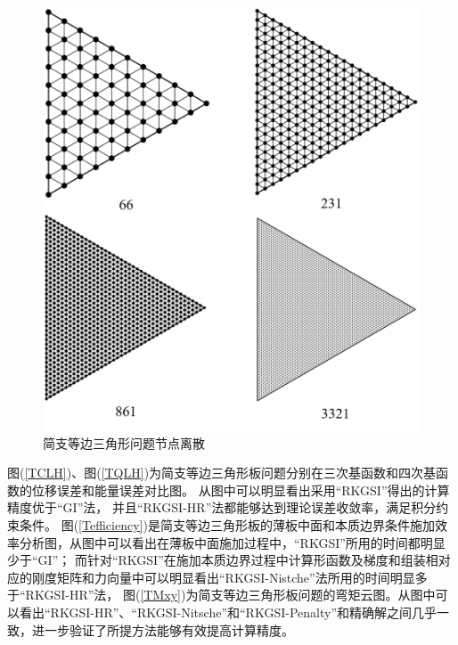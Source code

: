 \begin{figure}[H]
    \centering
    \includegraphics[scale=0.4]{figure/PHR/T/triangularmsh.png}
    \caption{简支等边三角形问题节点离散}\label{triangularmsh}
\end{figure}
图(\ref{TCLH})、图(\ref{TQLH})为简支等边三角形板问题分别在三次基函数和四次基函数的位移误差和能量误差对比图。
从图中可以明显看出采用“RKGSI”得出的计算精度优于“GI”法，
并且“RKGSI-HR”法都能够达到理论误差收敛率，满足积分约束条件。
图(\ref{Tefficiency})是简支等边三角形板的薄板中面和本质边界条件施加效率分析图，从图中可以看出在薄板中面施加过程中，“RKGSI”所用的时间都明显少于“GI”；
而针对“RKGSI”在施加本质边界过程中计算形函数及梯度和组装相对应的刚度矩阵和力向量中可以明显看出“RKGSI-Nistche”法所用的时间明显多于“RKGSI-HR”法，
图(\ref{TMxy})为简支等边三角形板问题的弯矩云图。从图中可以看出“RKGSI-HR”、“RKGSI-Nitsche”和“RKGSI-Penalty”和精确解之间几乎一致，进一步验证了所提方法能够有效提高计算精度。
